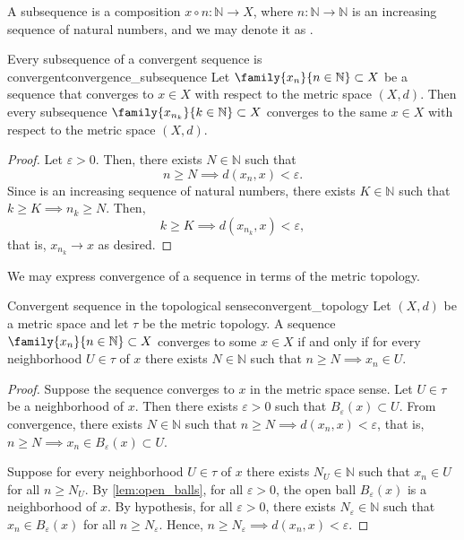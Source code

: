 A subsequence is a composition \(x \circ n : \mathbb{N} \to X\), where \(n : \mathbb{N} \to \mathbb{N}\) is an increasing sequence of natural numbers, and we may denote it as .
\begin{proposition}{Every subsequence of a convergent sequence is convergent}{convergence_subsequence}
    Let \(\family{x_n}{n\in \mathbb{N}} \subset X\) be a sequence that converges to \(x\in X\) with respect to the metric space \((X, d)\). Then every subsequence \(\family{x_{n_k}}{k\in \mathbb{N}}\subset X\) converges to the same \(x\in X\) with respect to the metric space \((X, d)\).
\end{proposition}
\begin{proof}
    Let \(\varepsilon > 0\). Then, there exists \(N \in \mathbb{N}\) such that
    \begin{equation*}
        n \geq N \implies d(x_n, x) < \varepsilon.
    \end{equation*}
    Since  is an increasing sequence of natural numbers, there exists \(K \in \mathbb{N}\) such that \(k \geq K \implies n_k \geq N\). Then,
    \begin{equation*}
        k \geq K \implies d(x_{n_k}, x) < \varepsilon,
    \end{equation*}
    that is, \(x_{n_k} \to x\) as desired.
\end{proof}

We may express convergence of a sequence in terms of the metric topology.
\begin{proposition}{Convergent sequence in the topological sense}{convergent_topology}
    Let \((X, d)\) be a metric space and let \(\tau\) be the metric topology. A sequence \(\family{x_n}{n\in \mathbb{N}}\subset X\) converges to some \(x \in X\) if and only if for every neighborhood \(U \in \tau\) of \(x\) there exists \(N\in \mathbb{N}\) such that \(n \geq N \implies x_n \in U\).
\end{proposition}
\begin{proof}
    Suppose the sequence converges to \(x\) in the metric space sense. Let \(U \in \tau\) be a neighborhood of \(x\). Then there exists \(\varepsilon > 0\) such that \(B_{\varepsilon}(x) \subset U\). From convergence, there exists \(N \in \mathbb{N}\) such that \(n \geq N \implies d(x_n, x) < \varepsilon\), that is, \(n \geq N \implies x_n \in B_{\varepsilon}(x) \subset U\).

    Suppose for every neighborhood \(U \in \tau\) of \(x\) there exists \(N_U \in \mathbb{N}\) such that \(x_n \in U\) for all \(n \geq N_U\). By \cref{lem:open_balls}, for all \(\varepsilon > 0\), the open ball \(B_{\varepsilon}(x)\) is a neighborhood of \(x\). By hypothesis, for all \(\varepsilon > 0\), there exists \(N_\varepsilon \in \mathbb{N}\) such that \(x_n \in B_{\varepsilon}(x)\) for all \(n \geq N_\varepsilon\). Hence, \(n \geq N_\varepsilon \implies d(x_n, x) < \varepsilon\).
\end{proof}

